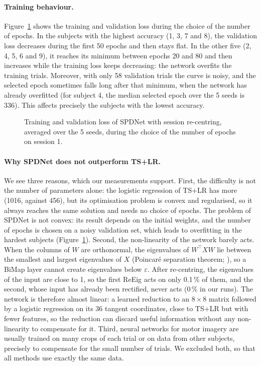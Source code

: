 \paragraph{Training behaviour.}
Figure~\ref{fig:curves} shows the training and validation loss during the choice of the number of epochs. In the subjects with the highest accuracy (1, 3, 7 and 8), the validation loss decreases during the first 50 epochs and then stays flat. In the other five (2, 4, 5, 6 and 9), it reaches its minimum between epochs 20 and 80 and then increases while the training loss keeps decreasing: the network overfits the training trials. Moreover, with only 58 validation trials the curve is noisy, and the selected epoch sometimes falls long after that minimum, when the network has already overfitted (for subject 4, the median selected epoch over the 5 seeds is 336). This affects precisely the subjects with the lowest accuracy.

\begin{figure}[htbp]
  \centering
  \caption{Training and validation loss of SPDNet with session re-centring, averaged over the 5 seeds, during the choice of the number of epochs on session 1.}
  \label{fig:curves}
\end{figure}

\paragraph{Why SPDNet does not outperform TS+LR.}
We see three reasons, which our measurements support. First, the difficulty is not the number of parameters alone: the logistic regression of TS+LR has more (1016, against 456), but its optimisation problem is convex and regularised, so it always reaches the same solution and needs no choice of epochs. The problem of SPDNet is not convex: its result depends on the initial weights, and the number of epochs is chosen on a noisy validation set, which leads to overfitting in the hardest subjects (Figure~\ref{fig:curves}). Second, the non-linearity of the network barely acts. When the columns of $W$ are orthonormal, the eigenvalues of $W^\top X W$ lie between the smallest and largest eigenvalues of $X$ (Poincaré separation theorem; \citealp{bhatia1997}), so a BiMap layer cannot create eigenvalues below $\varepsilon$. After re-centring, the eigenvalues of the input are close to 1, so the first ReEig acts on only 0.1\,\% of them, and the second, whose input has already been rectified, never acts (0\,\% in our runs). The network is therefore almost linear: a learned reduction to an $8 \times 8$ matrix followed by a logistic regression on its 36 tangent coordinates, close to TS+LR but with fewer features, so the reduction can discard useful information without any non-linearity to compensate for it. Third, neural networks for motor imagery are usually trained on many crops of each trial \citep{schirrmeister2017} or on data from other subjects, precisely to compensate for the small number of trials. We excluded both, so that all methods use exactly the same data.


